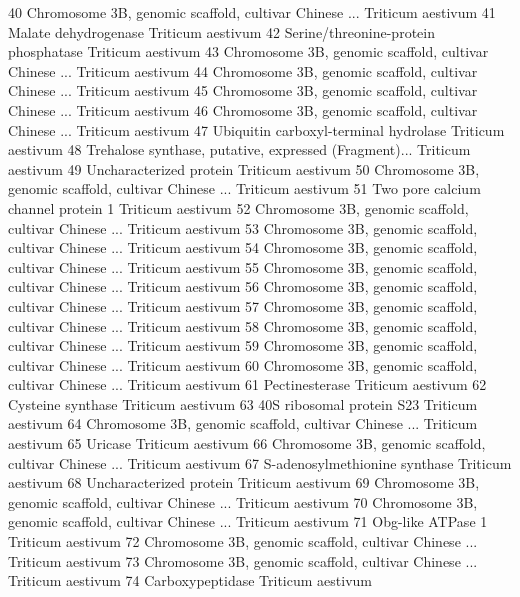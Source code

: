 \documentclass{beamer}
\begin{document}
\begin{frame}[fragile]
\begin{itemize}
\begin{Schunk}
\begin{Soutput}
40 Chromosome 3B, genomic scaffold, cultivar Chinese ...  Triticum aestivum
41                                   Malate dehydrogenase Triticum aestivum
42                   Serine/threonine-protein phosphatase Triticum aestivum
43 Chromosome 3B, genomic scaffold, cultivar Chinese ...  Triticum aestivum
44 Chromosome 3B, genomic scaffold, cultivar Chinese ...  Triticum aestivum
45 Chromosome 3B, genomic scaffold, cultivar Chinese ...  Triticum aestivum
46 Chromosome 3B, genomic scaffold, cultivar Chinese ...  Triticum aestivum
47                  Ubiquitin carboxyl-terminal hydrolase Triticum aestivum
48 Trehalose synthase, putative, expressed (Fragment)...  Triticum aestivum
49                                Uncharacterized protein Triticum aestivum
50 Chromosome 3B, genomic scaffold, cultivar Chinese ...  Triticum aestivum
51                     Two pore calcium channel protein 1 Triticum aestivum
52 Chromosome 3B, genomic scaffold, cultivar Chinese ...  Triticum aestivum
53 Chromosome 3B, genomic scaffold, cultivar Chinese ...  Triticum aestivum
54 Chromosome 3B, genomic scaffold, cultivar Chinese ...  Triticum aestivum
55 Chromosome 3B, genomic scaffold, cultivar Chinese ...  Triticum aestivum
56 Chromosome 3B, genomic scaffold, cultivar Chinese ...  Triticum aestivum
57 Chromosome 3B, genomic scaffold, cultivar Chinese ...  Triticum aestivum
58 Chromosome 3B, genomic scaffold, cultivar Chinese ...  Triticum aestivum
59 Chromosome 3B, genomic scaffold, cultivar Chinese ...  Triticum aestivum
60 Chromosome 3B, genomic scaffold, cultivar Chinese ...  Triticum aestivum
61                                         Pectinesterase Triticum aestivum
62                                      Cysteine synthase Triticum aestivum
63                              40S ribosomal protein S23 Triticum aestivum
64 Chromosome 3B, genomic scaffold, cultivar Chinese ...  Triticum aestivum
65                                                Uricase Triticum aestivum
66 Chromosome 3B, genomic scaffold, cultivar Chinese ...  Triticum aestivum
67                          S-adenosylmethionine synthase Triticum aestivum
68                                Uncharacterized protein Triticum aestivum
69 Chromosome 3B, genomic scaffold, cultivar Chinese ...  Triticum aestivum
70 Chromosome 3B, genomic scaffold, cultivar Chinese ...  Triticum aestivum
71                                      Obg-like ATPase 1 Triticum aestivum
72 Chromosome 3B, genomic scaffold, cultivar Chinese ...  Triticum aestivum
73 Chromosome 3B, genomic scaffold, cultivar Chinese ...  Triticum aestivum
74                                       Carboxypeptidase Triticum aestivum

\end{Soutput}
\end{Schunk}
\end{itemize}
\end{frame}
\end{document}
